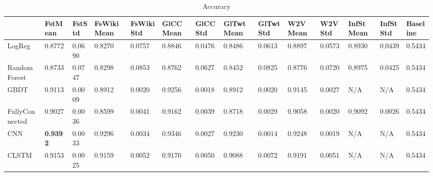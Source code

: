 \documentclass[unicode, 12pt, a4paper,oneside]{article}
\begin{document}
\begin{table}[]
\centering
\caption{Accuracy}
\label{acc1}
\begin{adjustbox}{width=\textwidth}
\begin{tabular}{@{}llllllllllllll@{}}
\multicolumn{1}{l|}{}                         & \multicolumn{1}{l|}{FstMean} & \multicolumn{1}{l|}{FstStd} & \multicolumn{1}{l|}{FsWikiMean} & \multicolumn{1}{l|}{FsWikiStd} & \multicolumn{1}{l|}{GlCCMean} & \multicolumn{1}{l|}{GlCCStd} & \multicolumn{1}{l|}{GlTwtMean} & \multicolumn{1}{l|}{GlTwtStd} & \multicolumn{1}{l|}{W2VMean} & \multicolumn{1}{l|}{W2VStd} & \multicolumn{1}{l|}{InfStMean} & \multicolumn{1}{l|}{InfStStd} & \multicolumn{1}{l|}{Baseline} \\ \midrule
\multicolumn{1}{|l|}{LogReg}         & 0.8772                    & 0.0690                   & 0.8270                    & 0.0757                   & 0.8846                    & 0.0476                   & 0.8486                    & 0.0613                   & 0.8897                    & 0.0573                   & 0.8930                    & 0.0439                   & 0.5434                        \\ \cmidrule(r){1-1}
\multicolumn{1}{|l|}{Random Forest}   & 0.8733                    & 0.0747                   & 0.8298                    & 0.0853                   & 0.8762                    & 0.0627                   & 0.8452                    & 0.0825                   & 0.8776                    & 0.0720                   & 0.8975                    & 0.0425                   & 0.5434                        \\ \cmidrule(r){1-1}
\multicolumn{1}{|l|}{GBDT}       & 0.9113                    & 0.0009                   & 0.8912                    & 0.0020                   & 0.9256                    & 0.0018                   & 0.8912                    & 0.0020                   & 0.9145                    & 0.0027                   & N/A                       &N/A                          & 0.5434                        \\ \cmidrule(r){1-1}
\multicolumn{1}{|l|}{FullyConnected} & 0.9027                    & 0.0036                   & 0.8599                    & 0.0041                   & 0.9162                    & 0.0039                   & 0.8718                    & 0.0029                   & 0.9058                    & 0.0020                   & 0.9092                    & 0.0026                   & 0.5434                        \\
\cmidrule(r){1-1}
\multicolumn{1}{|l|}{CNN} & {\bf 0.9392} &0.0033 &0.9296 &0.0034 & 0.9346 &0.0027 & 0.9230 &0.0014 & 0.9248 &0.0019 &N/A &N/A & 0.5434 \\
\cmidrule(r){1-1}
\multicolumn{1}{|l|}{CLSTM} & 0.9153 & 0.0025 & 0.9159 & 0.0052 & 0.9170 & 0.0050 & 0.9088 & 0.0072 &0.9191&0.0051&N/A&N/A&0.5434\\
 \bottomrule
\end{tabular}
\end{adjustbox}
\end{table}
\end{document}
